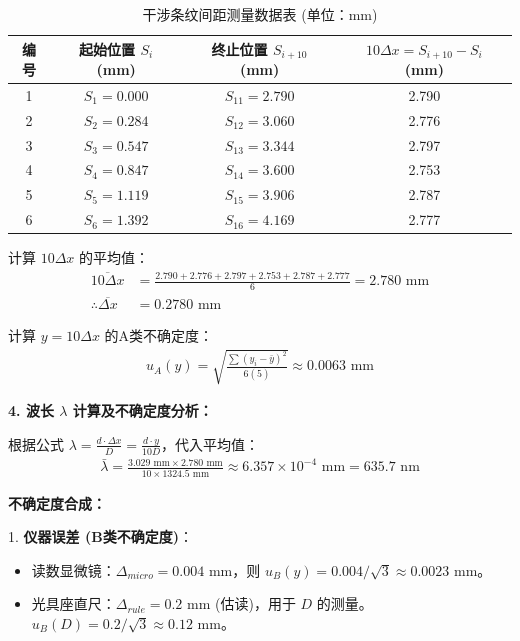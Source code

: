 \documentclass[10pt,a4paper]{ctexart}
\newcommand{\myspace}[1]{\par\vspace{#1\baselineskip}} %
\begin{document}
    \begin{table}[H]
    \centering 
    \caption{干涉条纹间距测量数据表 (单位：mm)}
    \label{tab:fringes} 
    \begin{tabular}{cccc}
        \toprule
        编号 & 起始位置 $S_i$ (mm) & 终止位置 $S_{i+10}$ (mm) & $10\Delta x = S_{i+10} - S_i$ (mm) \\
        \midrule
        1 & $S_1 = 0.000$ & $S_{11} = 2.790$ & 2.790 \\
        2 & $S_2 = 0.284$ & $S_{12} = 3.060$ & 2.776 \\
        3 & $S_3 = 0.547$ & $S_{13} = 3.344$ & 2.797 \\
        4 & $S_4 = 0.847$ & $S_{14} = 3.600$ & 2.753 \\
        5 & $S_5 = 1.119$ & $S_{15} = 3.906$ & 2.787 \\
        6 & $S_6 = 1.392$ & $S_{16} = 4.169$ & 2.777 \\
        \bottomrule
    \end{tabular}
    \end{table}

    计算 $10\Delta x$ 的平均值：
    \begin{align*}
        \overline{10\Delta x} &= \frac{2.790 + 2.776 + 2.797 + 2.753 + 2.787 + 2.777}{6} = 2.780 \text{ mm} \\
        \therefore \overline{\Delta x} &= 0.2780 \text{ mm}
    \end{align*}

    计算 $y = 10\Delta x$ 的A类不确定度：
    \begin{align*}
        u_A(y) = \sqrt{\frac{\sum(y_i - \bar{y})^2}{6(5)}} \approx 0.0063 \text{ mm}
    \end{align*}

    \myspace{1}

    \textbf{4. 波长 $\lambda$ 计算及不确定度分析：}

    根据公式 $\lambda = \frac{d \cdot \Delta x}{D} = \frac{d \cdot y}{10 D}$，代入平均值：
    \begin{align*}
        \bar{\lambda} = \frac{3.029 \text{ mm} \times 2.780 \text{ mm}}{10 \times 1324.5 \text{ mm}} \approx 6.357 \times 10^{-4} \text{ mm} = 635.7 \text{ nm}
    \end{align*}

    \textbf{不确定度合成：}
    
    1. \textbf{仪器误差 (B类不确定度)}：
       \begin{itemize}
           \item 读数显微镜：$\Delta_{micro} = 0.004 \text{ mm}$，则 $u_B(y) = 0.004/\sqrt{3} \approx 0.0023 \text{ mm}$。
           \item 光具座直尺：$\Delta_{rule} = 0.2 \text{ mm}$ (估读)，用于 $D$ 的测量。$u_B(D) = 0.2/\sqrt{3} \approx 0.12 \text{ mm}$。
       \end{itemize}
\end{document}
